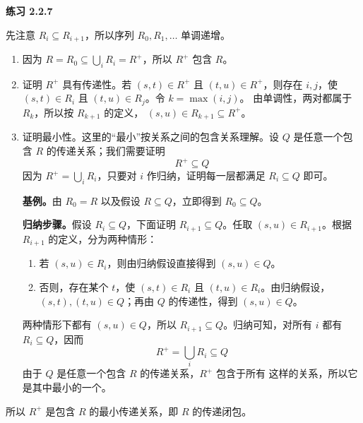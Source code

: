 \begin{taplsolutionentrybox}
\label{sol:translator:2.2.7}
\textbf{练习 2.2.7}

先注意 \(R_i\subseteq R_{i+1}\)，所以序列
\(R_0,R_1,\ldots\) 单调递增。

\begin{enumerate}[label=\textup{(\arabic*)},leftmargin=2.2em]
  \item 因为 \(R=R_0\subseteq\bigcup_iR_i=R^+\)，所以 \(R^+\)
    包含 \(R\)。

  \item 证明 \(R^+\) 具有传递性。若
    \((s,t)\in R^+\) 且 \((t,u)\in R^+\)，则存在 \(i,j\)，使
    \((s,t)\in R_i\) 且 \((t,u)\in R_j\)。令 \(k=\max(i,j)\)。
    由单调性，两对都属于 \(R_k\)，所以按 \(R_{k+1}\) 的定义，
    \((s,u)\in R_{k+1}\subseteq R^+\)。

  \item 证明最小性。这里的“最小”按关系之间的包含关系理解。设 \(Q\)
    是任意一个包含 \(R\) 的传递关系；我们需要证明
    \[
      R^+\subseteq Q
    \]
    因为 \(R^+=\bigcup_iR_i\)，只要对 \(i\) 作归纳，证明每一层都满足
    \(R_i\subseteq Q\) 即可。

    \textbf{基例。}由 \(R_0=R\) 以及假设 \(R\subseteq Q\)，立即得到
    \(R_0\subseteq Q\)。

    \textbf{归纳步骤。}假设 \(R_i\subseteq Q\)，下面证明
    \(R_{i+1}\subseteq Q\)。任取 \((s,u)\in R_{i+1}\)。根据
    \(R_{i+1}\) 的定义，分为两种情形：
    \begin{enumerate}[label=\textup{\alph*.},leftmargin=2.2em]
      \item 若 \((s,u)\in R_i\)，则由归纳假设直接得到
        \((s,u)\in Q\)。

      \item 否则，存在某个 \(t\)，使
        \((s,t)\in R_i\) 且 \((t,u)\in R_i\)。由归纳假设，
        \((s,t),(t,u)\in Q\)；再由 \(Q\) 的传递性，得到
        \((s,u)\in Q\)。
    \end{enumerate}
    两种情形下都有 \((s,u)\in Q\)，所以
    \(R_{i+1}\subseteq Q\)。归纳可知，对所有 \(i\) 都有
    \(R_i\subseteq Q\)，因而
    \[
      R^+=\bigcup_iR_i\subseteq Q
    \]
    由于 \(Q\) 是任意一个包含 \(R\) 的传递关系，\(R^+\) 包含于所有
    这样的关系，所以它是其中最小的一个。
\end{enumerate}

所以 \(R^+\) 是包含 \(R\) 的最小传递关系，即 \(R\) 的传递闭包。

\end{taplsolutionentrybox}

